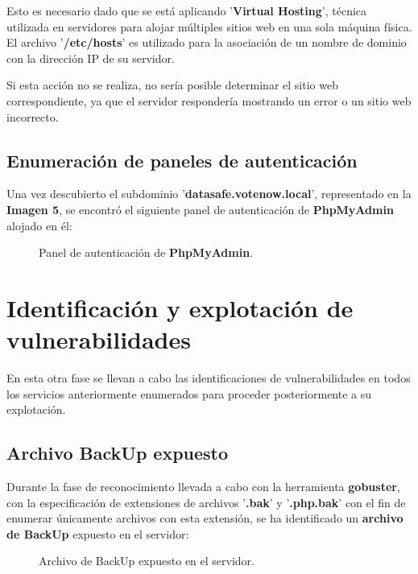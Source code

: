 \documentclass[a4paper]{article} %
\begin{document}
  Esto es necesario dado que se está aplicando '\textbf{Virtual Hosting}', técnica utilizada en servidores para alojar múltiples sitios web en una sola máquina física. El archivo '\textbf{/etc/hosts}' es utilizado para la asociación de un nombre de dominio con la dirección IP de su servidor.

  Si esta acción no se realiza, no sería posible determinar el sitio web correspondiente, ya que el servidor respondería mostrando un error o un sitio web incorrecto.

  \clearpage
  \subsection{Enumeración de paneles de autenticación}\label{sec:phpmyadmin}

  Una vez descubierto el subdominio '\textbf{datasafe.votenow.local}', representado en la \textbf{Imagen 5}, se encontró el siguiente panel de autenticación de \textbf{PhpMyAdmin} alojado en él:

  \vspace{0.2cm}

  \begin{figure}[h]
    \centering
    \setlength{\fboxrule}{0.8pt}
    \caption{Panel de autenticación de \textbf{PhpMyAdmin}.}
  \end{figure}

  \section{Identificación y explotación de vulnerabilidades}
  En esta otra fase se llevan a cabo las identificaciones de vulnerabilidades en todos los servicios anteriormente enumerados para proceder posteriormente a su explotación.

  \subsection{Archivo BackUp expuesto}\label{sec:backup}

  Durante la fase de reconocimiento llevada a cabo con la herramienta \textbf{gobuster}, con la especificación de extensiones de archivos '\textbf{.bak}' y '\textbf{.php.bak}' con el fin de enumerar únicamente archivos con esta extensión, se ha identificado un \textbf{archivo de BackUp} expuesto en el servidor:

  \begin{figure}[h]
    \centering
    \setlength{\fboxrule}{0.8pt}
    \caption{Archivo de BackUp expuesto en el servidor.}
  \end{figure}
\end{document}
